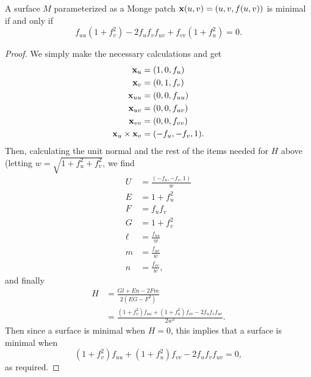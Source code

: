   \begin{thm}
    \label{thm:minimal_surface_eq}
    A surface $M$ parameterized as a Monge patch $\mathbf{x}(u, v) = (u, v, f(u, v))$ is minimal if and only if
    \begin{equation*}
      f_{uu}\left(1 + f_v^2\right) - 2f_uf_vf_{uv} + f_{vv}\left(1 + f_u^2\right) = 0.
    \end{equation*}
  \end{thm}
  \begin{proof}
    We simply make the necessary calculations and get
    \begin{align*}
      \mathbf{x}_u &= (1, 0, f_u)\\
      \mathbf{x}_v &= (0, 1, f_v)\\
      \mathbf{x}_{uu} &= (0, 0, f_{uu})\\
      \mathbf{x}_{uv} &= (0, 0, f_{uv})\\
      \mathbf{x}_{vv} &= (0, 0, f_{vv})\\
      \mathbf{x}_u \times \mathbf{x}_v &= (-f_u, -f_v, 1).
    \end{align*}
    Then, calculating the unit normal and the rest of the items needed for $H$ above (letting $w = \sqrt{1 + f_u^2 + f_v^2}$, we find
    \begin{align*}
      U &= \frac{(-f_u, -f_v, 1)}{w}\\
      E &= 1 + f_u^2\\
      F &= f_uf_v\\
      G &= 1 + f_v^2\\
      \ell &= \frac{f_{uu}}{w}\\
      m &= \frac{f_{uv}}{w}\\
      n &= \frac{f_{vv}}{w},
    \end{align*}
    and finally
    \begin{align*}
      H &= \frac{Gl + En - 2Fm}{2(EG - F^2)}\\
      &= \frac{(1 + f_v^2)f_{uu} + (1 + f_u^2)f_{vv} - 2f_uf_vf_{uv}}{2w^3}.
    \end{align*}
    Then since a surface is minimal when $H = 0$, this implies that a surface is minimal when 
    \[
      (1 + f_v^2)f_{uu} + (1 + f_u^2)f_{vv} - 2f_uf_vf_{uv} = 0,
    \]
    as required.
  \end{proof}
